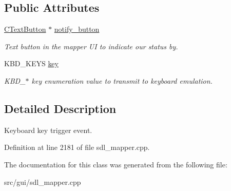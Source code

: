 \subsection*{Public Attributes}
\begin{DoxyCompactItemize}
\item 
\hypertarget{classCKeyEvent_a93407353bb472fc93fa7962f1c2e7933}{\hyperlink{classCTextButton}{C\-Text\-Button} $\ast$ \hyperlink{classCKeyEvent_a93407353bb472fc93fa7962f1c2e7933}{notify\-\_\-button}}\label{classCKeyEvent_a93407353bb472fc93fa7962f1c2e7933}

\begin{DoxyCompactList}\small\item\em Text button in the mapper U\-I to indicate our status by. \end{DoxyCompactList}\item 
\hypertarget{classCKeyEvent_aa5d774b3b526c036d79dbf87ba437afd}{K\-B\-D\-\_\-\-K\-E\-Y\-S \hyperlink{classCKeyEvent_aa5d774b3b526c036d79dbf87ba437afd}{key}}\label{classCKeyEvent_aa5d774b3b526c036d79dbf87ba437afd}

\begin{DoxyCompactList}\small\item\em K\-B\-D\-\_\-$\ast$ key enumeration value to transmit to keyboard emulation. \end{DoxyCompactList}\end{DoxyCompactItemize}


\subsection{Detailed Description}
Keyboard key trigger event. 

Definition at line 2181 of file sdl\-\_\-mapper.\-cpp.



The documentation for this class was generated from the following file\-:\begin{DoxyCompactItemize}
\item 
src/gui/sdl\-\_\-mapper.\-cpp\end{DoxyCompactItemize}
